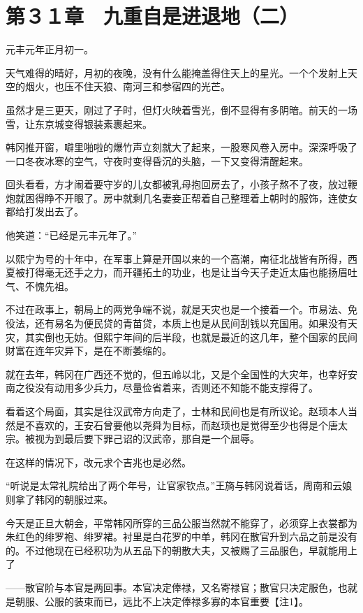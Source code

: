 \section{第３１章　九重自是进退地（二）}

元丰元年正月初一。

天气难得的晴好，月初的夜晚，没有什么能掩盖得住天上的星光。一个个发射上天空的烟火，也压不住天狼、南河三和参宿四的光芒。

虽然才是三更天，刚过了子时，但灯火映着雪光，倒不显得有多阴暗。前天的一场雪，让东京城变得银装素裹起来。

韩冈推开窗，噼里啪啦的爆竹声立刻就大了起来，一股寒风卷入房中。深深呼吸了一口冬夜冰寒的空气，守夜时变得昏沉的头脑，一下又变得清醒起来。

回头看看，方才闹着要守岁的儿女都被乳母抱回房去了，小孩子熬不了夜，放过鞭炮就困得睁不开眼了。房中就剩几名妻妾正帮着自己整理着上朝时的服饰，连使女都给打发出去了。

他笑道：“已经是元丰元年了。”

以熙宁为号的十年中，在军事上算是开国以来的一个高潮，南征北战皆有所得，西夏被打得毫无还手之力，而开疆拓土的功业，也是让当今天子走近太庙也能扬眉吐气、不愧先祖。

不过在政事上，朝局上的两党争端不说，就是天灾也是一个接着一个。市易法、免役法，还有易名为便民贷的青苗贷，本质上也是从民间刮钱以充国用。如果没有天灾，其实倒也无妨。但熙宁年间的后半段，也就是最近的这几年，整个国家的民间财富在连年灾异下，是在不断萎缩的。

就在去年，韩冈在广西还不觉的，但五岭以北，又是个全国性的大灾年，也幸好安南之役没有动用多少兵力，尽量俭省着来，否则还不知能不能支撑得了。

看着这个局面，其实是往汉武帝方向走了，士林和民间也是有所议论。赵顼本人当然是不喜欢的，王安石曾要他以尧舜为目标，而赵顼也是觉得至少也得是个唐太宗。被视为到最后要下罪己诏的汉武帝，那自是一个屈辱。

在这样的情况下，改元求个吉兆也是必然。

“听说是太常礼院给出了两个年号，让官家钦点。”王旖与韩冈说着话，周南和云娘则拿了韩冈的朝服过来。

今天是正旦大朝会，平常韩冈所穿的三品公服当然就不能穿了，必须穿上衣裳都为朱红色的绯罗袍、绯罗裙。衬里是白花罗的中单，韩冈在散官升到六品之前是没有的。不过他现在已经积功为从五品下的朝散大夫，又被赐了三品服色，早就能用上了

——散官阶与本官是两回事。本官决定俸禄，又名寄禄官；散官只决定服色，也就是朝服、公服的装束而已，远比不上决定俸禄多寡的本官重要【注1】。

